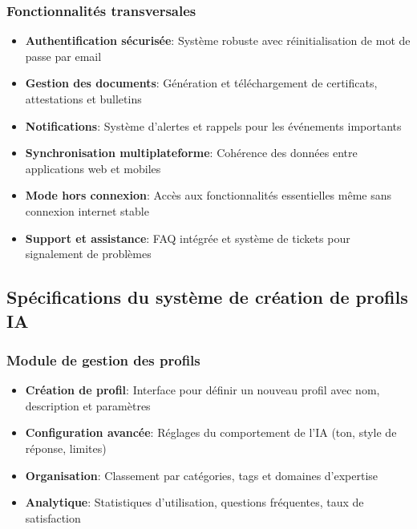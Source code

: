 \subsubsection{Fonctionnalités transversales}

\begin{itemize}
  \item \textbf{Authentification sécurisée}: Système robuste avec réinitialisation de mot de passe par email
  
  \item \textbf{Gestion des documents}: Génération et téléchargement de certificats, attestations et bulletins
  
  \item \textbf{Notifications}: Système d'alertes et rappels pour les événements importants
  
  \item \textbf{Synchronisation multiplateforme}: Cohérence des données entre applications web et mobiles
  
  \item \textbf{Mode hors connexion}: Accès aux fonctionnalités essentielles même sans connexion internet stable
  
  \item \textbf{Support et assistance}: FAQ intégrée et système de tickets pour signalement de problèmes
\end{itemize}

\subsection{Spécifications du système de création de profils IA}

\subsubsection{Module de gestion des profils}

\begin{itemize}
  \item \textbf{Création de profil}: Interface pour définir un nouveau profil avec nom, description et paramètres
  
  \item \textbf{Configuration avancée}: Réglages du comportement de l'IA (ton, style de réponse, limites)
  
  \item \textbf{Organisation}: Classement par catégories, tags et domaines d'expertise
  
  \item \textbf{Analytique}: Statistiques d'utilisation, questions fréquentes, taux de satisfaction
\end{itemize}

